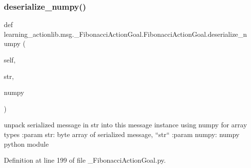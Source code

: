 \mbox{\label{classlearning__actionlib_1_1msg_1_1__FibonacciActionGoal_1_1FibonacciActionGoal_ab986e355cb860daa0899b9e738f09cf9}} 
\subsubsection{\texorpdfstring{deserialize\+\_\+numpy()}{deserialize\_numpy()}}
{\footnotesize\ttfamily def learning\+\_\+actionlib.\+msg.\+\_\+\+Fibonacci\+Action\+Goal.\+Fibonacci\+Action\+Goal.\+deserialize\+\_\+numpy (\begin{DoxyParamCaption}\item[{}]{self,  }\item[{}]{str,  }\item[{}]{numpy }\end{DoxyParamCaption})}

\begin{DoxyVerb}unpack serialized message in str into this message instance using numpy for array types
:param str: byte array of serialized message, ``str``
:param numpy: numpy python module
\end{DoxyVerb}
 

Definition at line 199 of file \+\_\+\+Fibonacci\+Action\+Goal.\+py.



